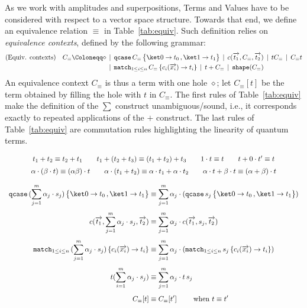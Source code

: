 \documentclass[10pt,a4paper]{article}
\newcommand{\textqcase}{\ensuremath{\mathtt{qcase}}}
\newcommand{\textmatch}{\ensuremath{\mathtt{match}}}
\newcommand{\zket}{\ket 0}
\newcommand{\oket}{\ket 1}
\newcommand{\qcasebase}[2]{
  \textqcase\,#1\left\{\! \begin{aligned} #2 \end{aligned}\right\}
}
\newcommand{\qcase}[3]{
  \qcasebase {#1} {\zket \to #2\,, \oket \to #3}
}
\newcommand{\qcasedefault}[1]{\ensuremath{\qcase{#1}{t_0}{t_1}}}
\newcommand{\matchdefaultcollapsedany}[2]{
  \textmatch_{1 \leq i \leq n}\,#1\,\{
    c_i(\overrightarrow{x_i}) \to #2_i
  \}
}
\newcommand{\matchdefaultcollapsed}[1]{\matchdefaultcollapsedany{#1}{t}}
\newcommand{\shape}[1]{\mathtt{shape}(#1)}
\newcommand{\equivcontext}{\ensuremath{C_\equiv}}
\newcommand{\gmid}{\,\mid\,}
\newcommand{\seq}[1]{\overrightarrow{#1}}
\begin{document}
As we work with amplitudes and superpositions, Terms and Values have to be
considered with respect to a vector space
structure. Towards that end, we define an equivalence relation $\equiv$ in
Table~\ref{tab:equiv}. Such definition relies on \emph{equivalence contexts},
defined by the following grammar:
\[
  \begin{aligned}
    (\text{Equiv. contexts}) \quad   \equivcontext \Coloneqq \diamond & \gmid
    \qcasedefault \equivcontext \gmid c(\seq{t_1}, \equivcontext, \seq{t_2})
    \gmid t \equivcontext \gmid \equivcontext t\\
    &\gmid \matchdefaultcollapsed{\equivcontext}  \gmid t + \equivcontext \gmid
    \shape \equivcontext
  \end{aligned}
\]
An equivalence context $\equivcontext$ is thus a term with one hole $\diamond$;
let $\equivcontext[t]$ be the term obtained by filling the hole with
$t$ in $\equivcontext$.
The first rules of Table~\ref{tab:equiv} make the definition of the $\sum$
construct unambiguous/sound, i.e., it corresponds exactly to repeated
applications of the $+$ construct. The last rules of Table~\ref{tab:equiv} are
commutation rules highlighting the linearity of quantum terms.

\begingroup
\renewcommand\displaystyle\textstyle
\newcommand\sep{\\[1.25ex]}
\begin{table}[t]
  \centering
  \[
    \begin{array}{c}
      t_1 + t_2 \equiv t_2 + t_1
      \qquad
      t_1 + (t_2 + t_3) \equiv (t_1 + t_2) + t_3
      \qquad
      1 \cdot t \equiv t
      \qquad
      t + 0 \cdot t' \equiv t
      \sep
      \alpha \cdot (\beta \cdot t) \equiv (\alpha \beta) \cdot t
      \qquad
      \alpha \cdot (t_1 + t_2) \equiv \alpha \cdot t_1 + \alpha \cdot t_2
      \qquad
      \alpha \cdot t + \beta \cdot t \equiv (\alpha + \beta) \cdot t
      \\[1.2em]
      \begin{aligned}
        \qcasedefault {(\sum_{j=1}^m \alpha_j \cdot s_j)} &\equiv
        \sum_{j=1}^m \alpha_j \cdot (\qcasedefault{s_j})
        \sep
        c(\seq{t_1}, \sum_{j=1}^m \alpha_j \cdot s_j,
        \seq{t_2}) &\equiv \sum_{j=1}^m \alpha_j \cdot
        c(\seq{t_1}, s_j, \seq{t_2})
        \sep
        \matchdefaultcollapsed{(\sum_{j=1}^m \alpha_j \cdot s_j)}
        &\equiv \sum_{j=1}^m \alpha_j \cdot (\matchdefaultcollapsed{s_j})
        \sep
        t(\sum_{i=1}^m \alpha_j \cdot s_j) &\equiv \sum_{j=1}^m
        \alpha_j \cdot t\,s_j
        \sep
        \equivcontext[t] &\equiv \equivcontext[t'] \qquad \text{ when
        } t \equiv t'
      \end{aligned}
    \end{array}
  \]
  \caption{Equivalence relation $\equiv\ \subseteq\ \text{Terms}
  \times \text{Terms}$}
  \label{tab:equiv}
\end{table}
\end{document}
